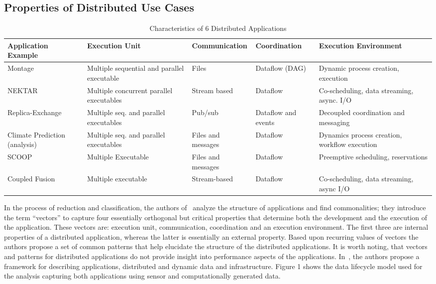\documentclass{acm_proc_article-sp}
\begin{document}
\subsection{Properties of Distributed Use Cases}
\begin{table}
\centering
\caption{Characteristics of 6 Distributed Applications}
\label{Table4}
\begin{tabular}{|p{2cm}|p{2cm}|p{3cm}|p{2cm}|p{3cm}|} \hline
\textbf{Application Example} & \textbf{Execution Unit} & \textbf{Communication} & \textbf{Coordination} & \textbf{Execution Environment} \\ \hline
Montage & Multiple sequential and parallel executable & Files & Dataflow (DAG) & Dynamic process creation, execution \\ \hline
NEKTAR  & Multiple concurrent parallel executables & Stream based & Dataflow & Co-scheduling, data streaming, async. I/O \\ \hline
Replica-Exchange & Multiple seq. and parallel executables & Pub/sub & Dataflow and events & Decoupled coordination and messaging \\ \hline
Climate Prediction (analysis)& Multiple seq. and parallel executables & Files and messages & Dataflow & Dynamics process creation, workflow execution \\ \hline
SCOOP & Multiple Executable & Files and messages & Dataflow & Preemptive scheduling, reservations \\ \hline
Coupled Fusion & Multiple executable & Stream-based & Dataflow & Co-scheduling, data streaming, async I/O
\\ \hline
\end{tabular}
\end{table} 

In the process of reduction and classification, the authors of~\cite{b28,b26}
analyze the structure of applications and find commonalities; they introduce
the term ``vectors'' to capture four essentially orthogonal but critical
properties that determine both the development and the execution of the
application. These vectors are: execution unit, communication, coordination and
an execution environment. The first three are internal properties of a
distributed application, whereas the latter is essentially an external
property. Based upon recurring values of vectors the authors propose a set of
common patterns that help elucidate the structure of the distributed
applications. It is worth noting, that vectors and patterns for distributed
applications do not provide insight into performance aspects of the
applications. In~\cite{b28}, the authors propose a framework for describing
applications, distributed and dynamic data and infrastructure. Figure 1 shows
the data lifecycle model used for the analysis capturing both applications
using sensor and computationally generated data.
\end{document}

